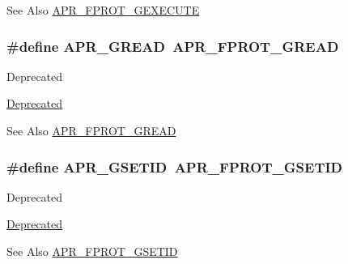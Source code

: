 \begin{DoxySeeAlso}{See Also}
\hyperlink{group__apr__file__permissions_gab627bef3f9ceb84bbf00906eaeb12184}{A\-P\-R\-\_\-\-F\-P\-R\-O\-T\-\_\-\-G\-E\-X\-E\-C\-U\-T\-E} 
\end{DoxySeeAlso}
\hypertarget{group__apr__file__permissions_ga1bd0305f31cb3bb20a8f9db898b96eb1}{
\subsubsection[{A\-P\-R\-\_\-\-G\-R\-E\-A\-D}]{\setlength{\rightskip}{0pt plus 5cm}\#define A\-P\-R\-\_\-\-G\-R\-E\-A\-D~{\bf A\-P\-R\-\_\-\-F\-P\-R\-O\-T\-\_\-\-G\-R\-E\-A\-D}}}\label{group__apr__file__permissions_ga1bd0305f31cb3bb20a8f9db898b96eb1}
\begin{DoxyRefDesc}{Deprecated}
\item[\hyperlink{deprecated__deprecated000008}{Deprecated}]\end{DoxyRefDesc}
\begin{DoxySeeAlso}{See Also}
\hyperlink{group__apr__file__permissions_ga5ad9b67b8008db3ffc56c3c2a65aa192}{A\-P\-R\-\_\-\-F\-P\-R\-O\-T\-\_\-\-G\-R\-E\-A\-D} 
\end{DoxySeeAlso}
\hypertarget{group__apr__file__permissions_ga4e4e9bb05f2bb156b174461551c9c329}{
\subsubsection[{A\-P\-R\-\_\-\-G\-S\-E\-T\-I\-D}]{\setlength{\rightskip}{0pt plus 5cm}\#define A\-P\-R\-\_\-\-G\-S\-E\-T\-I\-D~{\bf A\-P\-R\-\_\-\-F\-P\-R\-O\-T\-\_\-\-G\-S\-E\-T\-I\-D}}}\label{group__apr__file__permissions_ga4e4e9bb05f2bb156b174461551c9c329}
\begin{DoxyRefDesc}{Deprecated}
\item[\hyperlink{deprecated__deprecated000007}{Deprecated}]\end{DoxyRefDesc}
\begin{DoxySeeAlso}{See Also}
\hyperlink{group__apr__file__permissions_ga5fcf6746afdd4e9b8be6ceab6892a3f5}{A\-P\-R\-\_\-\-F\-P\-R\-O\-T\-\_\-\-G\-S\-E\-T\-I\-D} 
\end{DoxySeeAlso}
